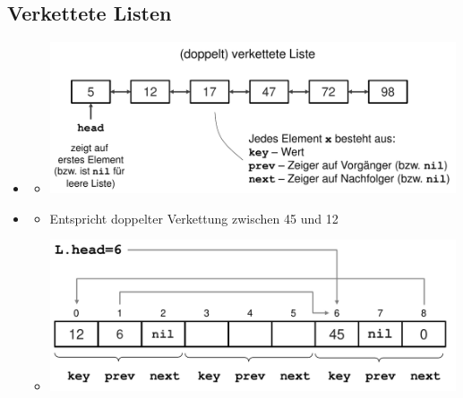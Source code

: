 \documentclass[
    12pt,
    a4paper,
    ngerman,
    color=3b,%
    marginpar=false,
    colorback=false,
    leqno,
]{tudaexercise}
\begin{document}
\subsection{Verkettete Listen}\label{Verkettete Listen}
\begin{itemize}
    \item {}
          \begin{itemize}
              \item[] \includegraphics[width=12cm]{pictures/linkedList1.pdf}
          \end{itemize}

    \item {}
          \begin{itemize}
              \item[] Entspricht doppelter Verkettung zwischen 45 und 12
              \item[] \includegraphics[width=12cm]{pictures/linkedList2.pdf}
          \end{itemize}


\end{itemize}
\end{document}
